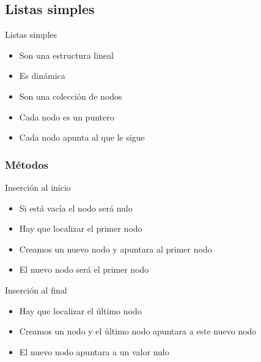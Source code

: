 \documentclass{beamer}
\begin{document}
\subsection{Listas simples}

\begin{frame}{Listas simples}
	\begin{itemize}
		\item Son una estructura lineal
		\item Es din\'amica
		\item Son una colecci\'on de nodos
		\item Cada nodo es un puntero
		\item Cada nodo apunta al que le sigue
	\end{itemize}
	\centering
\end{frame}

\subsubsection{M\'etodos}

\begin{frame}{Inserci\'on al inicio}
	\begin{itemize}
		\item Si est\'a vac\'ia el nodo ser\'a nulo
		\item Hay que localizar el primer nodo
		\item Creamos un nuevo nodo y apuntara al primer nodo
		\item El nuevo nodo será el primer nodo
	\end{itemize}
\end{frame}

\begin{frame}{Inserci\'on al final}
	\begin{itemize}
		\item Hay que localizar el \'ultimo  nodo
		\item Creamos un nodo y el \'ultimo nodo apuntara a este nuevo nodo
		\item El nuevo nodo apuntara a un valor nulo
	\end{itemize}
\end{frame}
\end{document}
